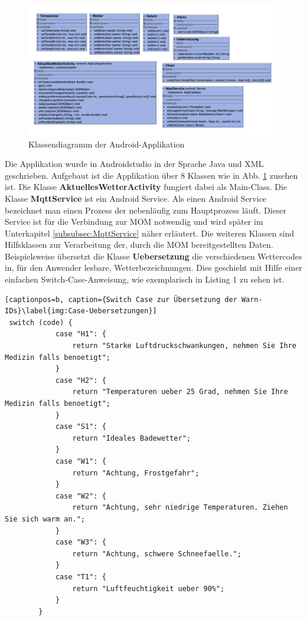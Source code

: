 \begin{figure}[!htbp]
	\centering
	\includegraphics[width=1.0\textwidth]{Bilder/AndroidUML.png}
	\caption{Klassendiagramm der Android-Applikation}
	\label{img:AndroidUMLDiagramm}
\end{figure} 
Die Applikation wurde in Androidstudio in der Sprache Java und XML geschrieben. 
Aufgebaut ist die Applikation über 8 Klassen wie in  Abb. \ref{img:AndroidUMLDiagramm} zusehen ist. Die Klasse \textbf{AktuellesWetterActivity} fungiert dabei als Main-Class.
Die Klasse \textbf{MqttService} ist ein Android Service. Als einen Android Service bezeichnet man einen Prozess der nebenläufig zum Hauptprozess läuft. Dieser Service ist für die Verbindung zur MOM notwendig und wird später im Unterkapitel \ref{subsubsec:MqttService} näher erläutert.
Die weiteren Klassen sind Hilfsklassen zur Verarbeitung der, durch die MOM bereitgestellten Daten.
Beispielsweise übersetzt die Klasse \textbf{Uebersetzung} die verschiedenen Wettercodes in, für den Anwender lesbare, Wetterbezeichnungen. Dies geschieht mit Hilfe einer einfachen Switch-Case-Anweisung, wie exemplarisch in Listing 1 zu sehen ist.
  \begin{lstlisting}[captionpos=b, caption={Switch Case zur Übersetzung der Warn-IDs}\label{img:Case-Uebersetzungen}]
 switch (code) {
            case "H1": {
                return "Starke Luftdruckschwankungen, nehmen Sie Ihre Medizin falls benoetigt";
            }
            case "H2": {
                return "Temperaturen ueber 25 Grad, nehmen Sie Ihre Medizin falls benoetigt";
            }
            case "S1": {
                return "Ideales Badewetter";
            }
            case "W1": {
                return "Achtung, Frostgefahr";
            }
            case "W2": {
                return "Achtung, sehr niedrige Temperaturen. Ziehen Sie sich warm an.";
            }
            case "W3": {
                return "Achtung, schwere Schneefaelle.";
            }
            case "T1": {
                return "Luftfeuchtigkeit ueber 90%";
            }
        }
	
\end{lstlisting} 

